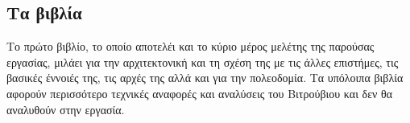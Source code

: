 \subsection{Τα βιβλία}

Το πρώτο βιβλίο, το οποίο αποτελέι και το κύριο μέρος μελέτης της παρούσας εργασίας, μιλάει για την αρχιτεκτονική και τη σχέση της με τις άλλες επιστήμες, τις βασικές έννοιές της, τις αρχές της αλλά και για την πολεοδομία. Τα υπόλοιπα βιβλία αφορούν περισσότερο τεχνικές αναφορές και αναλύσεις του Βιτρούβιου και δεν θα αναλυθούν στην εργασία.






